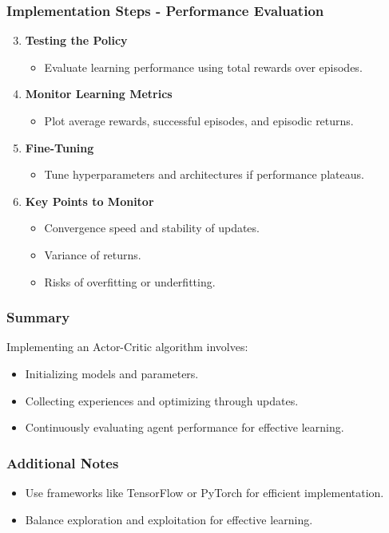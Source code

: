 \documentclass[aspectratio=169]{beamer}
\begin{document}
\begin{frame}[fragile]
    \frametitle{Implementation Steps - Performance Evaluation}
    \begin{enumerate}
        \setcounter{enumi}{2}
        \item \textbf{Testing the Policy}
            \begin{itemize}
                \item Evaluate learning performance using total rewards over episodes.
            \end{itemize}
        \item \textbf{Monitor Learning Metrics}
            \begin{itemize}
                \item Plot average rewards, successful episodes, and episodic returns.
            \end{itemize}
        \item \textbf{Fine-Tuning}
            \begin{itemize}
                \item Tune hyperparameters and architectures if performance plateaus.
            \end{itemize}
        \item \textbf{Key Points to Monitor}
            \begin{itemize}
                \item Convergence speed and stability of updates.
                \item Variance of returns.
                \item Risks of overfitting or underfitting.
            \end{itemize}
    \end{enumerate}
\end{frame}

\begin{frame}[fragile]
    \frametitle{Summary}
    Implementing an Actor-Critic algorithm involves:
    \begin{itemize}
        \item Initializing models and parameters.
        \item Collecting experiences and optimizing through updates.
        \item Continuously evaluating agent performance for effective learning.
    \end{itemize}
\end{frame}

\begin{frame}[fragile]
    \frametitle{Additional Notes}
    \begin{itemize}
        \item Use frameworks like TensorFlow or PyTorch for efficient implementation.
        \item Balance exploration and exploitation for effective learning.
    \end{itemize}
\end{frame}
\end{document}
